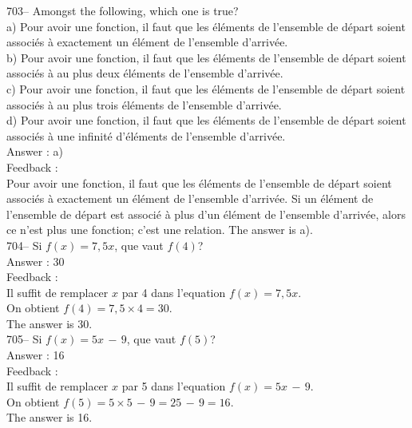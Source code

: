 \documentclass[letterpaper, 12pt]{article}
\begin{document}
703-- Amongst the following, which one is true?\\
a) Pour avoir une fonction, il faut que les \'el\'ements de
l'ensemble de d\'epart soient associ\'es \`a exactement un
\'el\'ement de l'ensemble
d'arriv\'ee.\\
b) Pour avoir une fonction, il faut que les \'el\'ements de l'ensemble de
d\'epart soient associ\'es \`a au plus deux \'el\'ements de l'ensemble
d'arriv\'ee.\\
c) Pour avoir une fonction, il faut que les \'el\'ements de l'ensemble de
d\'epart soient associ\'es \`a au plus trois \'el\'ements de l'ensemble
d'arriv\'ee.\\
d) Pour avoir une fonction, il faut que les \'el\'ements de l'ensemble de
d\'epart soient associ\'es \`a une infinit\'e d'\'el\'ements de l'ensemble
d'arriv\'ee.\\

Answer : a)\\

Feedback : \\
Pour avoir une fonction, il faut que les \'el\'ements de l'ensemble
de d\'epart soient associ\'es \`a exactement un \'el\'ement de
l'ensemble d'arriv\'ee.  Si un \'el\'ement de l'ensemble de d\'epart
est associ\'e \`a plus d'un \'el\'ement de l'ensemble d'arriv\'ee,
alors ce n'est plus une
fonction; c'est une relation.  The answer is a).\\

704-- Si $f(x)=7,5x$, que vaut $f(4)$?\\

Answer : 30\\

Feedback : \\
Il suffit de remplacer $x$ par 4 dans l'equation $f(x)=7,5x$.  \\
On obtient $f(4)=7,5\times4=30$.\\
The answer is 30.\\

705-- Si $f(x)=5x\,-\,9$, que vaut  $f(5)$?\\

Answer :  16\\

Feedback :  \\
Il suffit de remplacer $x$ par 5 dans l'equation $ f(x)=5x\,-\,9$.\\
On obtient $f(5)=5\times 5\,-\,9=25\,-\,9=16$.\\
The answer is 16.\\
\end{document}
